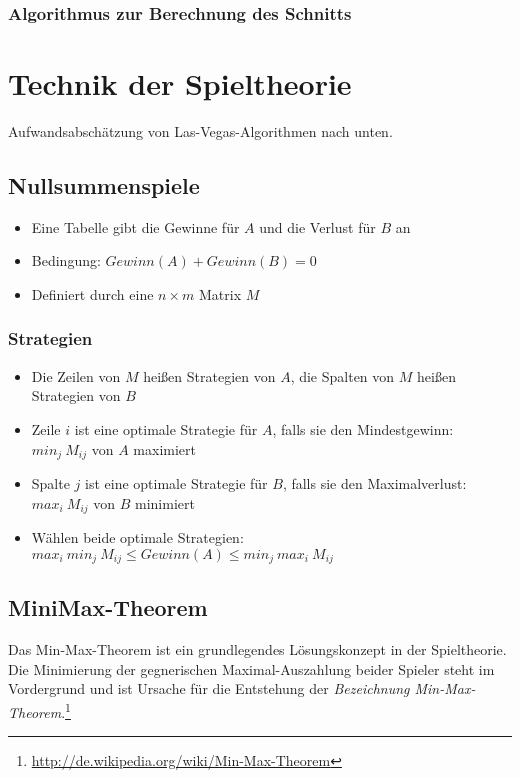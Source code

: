 \subsubsection{Algorithmus zur Berechnung des Schnitts}




\section{Technik der Spieltheorie}
Aufwandsabschätzung von Las-Vegas-Algorithmen nach unten.

\subsection{Nullsummenspiele}
\begin{itemize}
	\item Eine Tabelle gibt die Gewinne für \(A\) und die Verlust für \(B\) an
	\item Bedingung: \(Gewinn(A) + Gewinn(B) = 0\)
	\item Definiert durch eine \(n \times m\) Matrix \(M\)
\end{itemize}

\subsubsection{Strategien}
\begin{itemize}
	\item Die Zeilen von \(M\) heißen Strategien von \(A\), die Spalten von \(M\) heißen Strategien von \(B\)
	\item Zeile \(i\) ist eine optimale Strategie für \(A\), falls sie den Mindestgewinn: \(min_j~M_{ij}\) von \(A\) maximiert
	\item Spalte \(j\) ist eine optimale Strategie für \(B\), falls sie den Maximalverlust: \(max_i~M_{ij}\) von \(B\) minimiert
	\item Wählen beide optimale Strategien: \(max_i~min_j~M_{ij} \leq Gewinn(A) \leq min_j~max_i~M_{ij}\)
\end{itemize}


\subsection{MiniMax-Theorem}
Das Min-Max-Theorem ist ein grundlegendes Lösungskonzept in der Spieltheorie. Die Minimierung der gegnerischen Maximal-Auszahlung beider Spieler steht im Vordergrund und ist Ursache für die Entstehung der \textit{Bezeichnung Min-Max-Theorem}.\footnote{\url{http://de.wikipedia.org/wiki/Min-Max-Theorem}}


